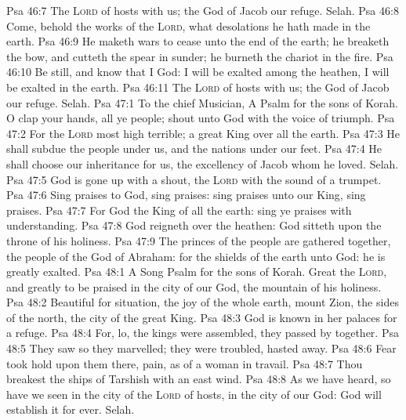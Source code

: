 \vs Psa 46:7 The \textsc{Lord} of hosts  with us; the God of Jacob  our refuge. Selah.
\vs Psa 46:8 Come, behold the works of the \textsc{Lord}, what desolations he hath made in the earth.
\vs Psa 46:9 He maketh wars to cease unto the end of the earth; he breaketh the bow, and cutteth the spear in sunder; he burneth the chariot in the fire.
\vs Psa 46:10 Be still, and know that I  God: I will be exalted among the heathen, I will be exalted in the earth.
\vs Psa 46:11 The \textsc{Lord} of hosts  with us; the God of Jacob  our refuge. Selah.
\vs Psa 47:1 To the chief Musician, A Psalm for the sons of Korah. O clap your hands, all ye people; shout unto God with the voice of triumph.
\vs Psa 47:2 For the \textsc{Lord} most high  terrible;  a great King over all the earth.
\vs Psa 47:3 He shall subdue the people under us, and the nations under our feet.
\vs Psa 47:4 He shall choose our inheritance for us, the excellency of Jacob whom he loved. Selah.
\vs Psa 47:5 God is gone up with a shout, the \textsc{Lord} with the sound of a trumpet.
\vs Psa 47:6 Sing praises to God, sing praises: sing praises unto our King, sing praises.
\vs Psa 47:7 For God  the King of all the earth: sing ye praises with understanding.
\vs Psa 47:8 God reigneth over the heathen: God sitteth upon the throne of his holiness.
\vs Psa 47:9 The princes of the people are gathered together,  the people of the God of Abraham: for the shields of the earth  unto God: he is greatly exalted.
\vs Psa 48:1 A Song  Psalm for the sons of Korah. Great  the \textsc{Lord}, and greatly to be praised in the city of our God,  the mountain of his holiness.
\vs Psa 48:2 Beautiful for situation, the joy of the whole earth,  mount Zion,  the sides of the north, the city of the great King.
\vs Psa 48:3 God is known in her palaces for a refuge.
\vs Psa 48:4 For, lo, the kings were assembled, they passed by together.
\vs Psa 48:5 They saw  so they marvelled; they were troubled,  hasted away.
\vs Psa 48:6 Fear took hold upon them there,  pain, as of a woman in travail.
\vs Psa 48:7 Thou breakest the ships of Tarshish with an east wind.
\vs Psa 48:8 As we have heard, so have we seen in the city of the \textsc{Lord} of hosts, in the city of our God: God will establish it for ever. Selah.
